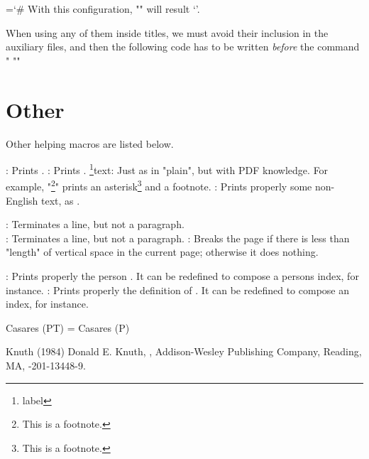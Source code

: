 \continuepar
\begingroup\chardef\diffchar=`\#\def\colornew{Green}\def\colordel{DarkWhite}%
With this configuration,
"" will result `'.
\endgroup

When using any of them inside titles,
we must avoid their inclusion in the auxiliary files,
and then the following code
has to be written {\em before} the command "
"\def\doextrasave{\def\diff##1##2{##1}\def\new/##1\wen/{##1}%
 \def\del/##1\led/{}}"


\section{Other}

Other helping macros are listed below.

\command\todayiso: Prints \todayiso.
\command\QED: Prints \QED.
\command\footnote{label}{text}: Just as in "plain",
 but with PDF knowledge.
 For example, "\footnote*{This is a footnote.}" prints
 an asterisk\footnote*{This is a footnote.} and a footnote.
\command{}: Prints properly some
 non-English text, as .

\command\newline: Terminates a line, but not a paragraph.
\command\\: Terminates a line, but not a paragraph.
\command{}: Breaks the page if there is
 less than "length" of vertical space in the current page;
 otherwise it does nothing.

\command{}: Prints properly the person .
 It can be redefined to compose a persons index, for instance.
\command{}: Prints properly
 the definition of .
 It can be redefined to compose an index, for instance.



\xitem Casares (PT) = Casares (P)

 Knuth (1984)
Donald E. Knuth,
,
Addison-Wesley Publishing Company, Reading, MA,
-201-13448-9.

\endreferences


\bye
